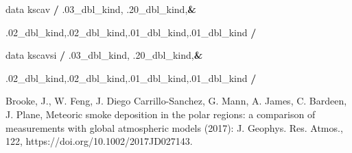 \documentclass[11pt]{article}
\newenvironment{Shaded}{}{}
\newcommand{\KeywordTok}[1]{\textcolor[rgb]{0.00,0.44,0.13}{\textbf{{#1}}}}
\newcommand{\DataTypeTok}[1]{\textcolor[rgb]{0.56,0.13,0.00}{{#1}}}
\newcommand{\FloatTok}[1]{\textcolor[rgb]{0.25,0.63,0.44}{{#1}}}
\newcommand{\NormalTok}[1]{{#1}}
\begin{document}
\begin{Shaded}
\begin{Highlighting}[]
\DataTypeTok{  data}\NormalTok{ kscav   }\KeywordTok{/} \FloatTok{.03_dbl_kind}\NormalTok{, }\FloatTok{.20_dbl_kind}\NormalTok{,}\KeywordTok{&}

       \FloatTok{.02_dbl_kind}\NormalTok{,}\FloatTok{.02_dbl_kind}\NormalTok{,}\FloatTok{.01_dbl_kind}\NormalTok{,}\FloatTok{.01_dbl_kind} \KeywordTok{/}

\DataTypeTok{  data}\NormalTok{ kscavsi }\KeywordTok{/} \FloatTok{.03_dbl_kind}\NormalTok{, }\FloatTok{.20_dbl_kind}\NormalTok{,}\KeywordTok{&}

       \FloatTok{.02_dbl_kind}\NormalTok{,}\FloatTok{.02_dbl_kind}\NormalTok{,}\FloatTok{.01_dbl_kind}\NormalTok{,}\FloatTok{.01_dbl_kind} \KeywordTok{/}
\end{Highlighting}
\end{Shaded}

Brooke, J., W. Feng, J. Diego Carrillo-Sanchez, G. Mann, A. James, C.
Bardeen, J. Plane, Meteoric smoke deposition in the polar regions: a
comparison of measurements with global atmospheric models (2017): J.
Geophys. Res. Atmos., 122, https://doi.org/10.1002/2017JD027143.
\end{document}
